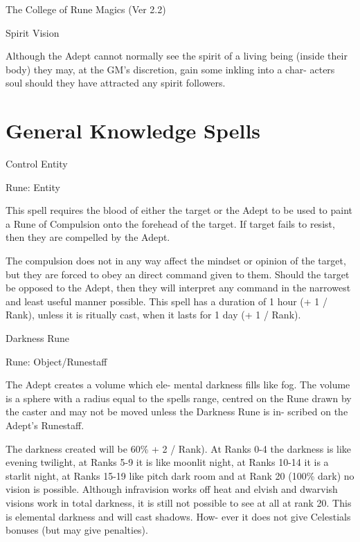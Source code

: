 \begin{Chapter}{The College of Rune Magics (Ver 2.2)}
\begin{talent}[T-2]{Spirit Vision }
\begin{effects}
Although the  Adept cannot  normally  see  the  spirit 
of  a  living  being  (inside  their  body)  they  may,  at 
the GM’s discretion, gain some inkling into a char-
acters  soul  should  they  have  attracted  any  spirit 
followers. 


\end{effects}
\end{talent}

\section{General Knowledge Spells}

\begin{spell}[G-1]{Control Entity }

Rune: Entity 
\begin{effects}
 This  spell  requires  the  blood  of  either  the 
target  or  the  Adept  to  be  used  to  paint  a  Rune  of 
Compulsion  onto  the  forehead  of  the  target.  If 
target fails to resist, then they are compelled by the 
Adept. 

The  compulsion  does  not  in  any  way  affect  the 
mindset or opinion of the target, but they are forced 
to  obey  an direct  command  given  to them.  Should 
the  target  be  opposed  to  the  Adept,  then  they  will 
interpret  any  command  in  the  narrowest  and  least 
useful manner possible. This spell has a duration of 
1 hour (+ 1 / Rank), unless it is ritually cast, when 
it lasts for 1 day (+ 1 / Rank). 


\end{effects}
\end{spell}

\begin{spell}[G-2]{Darkness Rune }

Rune: Object/Runestaff 
\begin{effects}
 The  Adept  creates  a  volume  which  ele-
mental  darkness  fills  like  fog.  The  volume  is  a 
sphere  with  a  radius  equal  to  the  spells  range, 
centred  on  the  Rune  drawn  by  the  caster  and  may 
not  be  moved  unless  the  Darkness  Rune  is  in-
scribed on the Adept’s Runestaff. 

The darkness created will be 60\% + 2 / Rank). At 
Ranks  0-4 the  darkness is  like  evening  twilight, at 
Ranks 5-9 it is like moonlit night, at Ranks 10-14 it 
is  a  starlit  night,  at  Ranks  15-19  like  pitch  dark 
room  and  at  Rank  20  (100\%  dark)  no  vision  is 
possible.  Although  infravision  works  off  heat  and 
elvish and dwarvish visions work in total darkness, 
it is still not possible to see at all at rank 20. This is 
elemental  darkness  and  will  cast  shadows.  How-
ever  it  does  not  give  Celestials  bonuses  (but  may 
give penalties). 


\end{effects}
\end{spell}
\end{Chapter}
